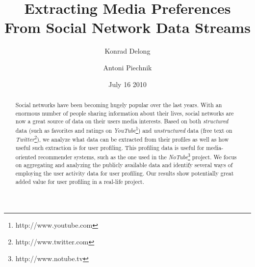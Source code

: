 \documentclass{article}
\begin{document}
\title{\textbf{Extracting Media Preferences From Social Network Data Streams}}
\author{Konrad Delong \and Antoni Piechnik}
\date{July 16 2010}

\maketitle

\begin{abstract} Social networks have been becoming hugely popular over the last
years. With an enormous number of people sharing information about their lives,
social networks are now a great source of data on their users media interests. Based on both
\textit{structured} data (such as favorites and ratings on \textit{YouTube}\footnote{http://www.youtube.com})
and \textit{unstructured} data (free text on \textit{Twitter}\footnote{http://www.twitter.com}),
we analyze what data can be extracted from their profiles as well as how useful such extraction
is for user profiling. This profiling data is useful for media-oriented recommender
systems, such as the one used in the \textit{NoTube}\footnote{http://www.notube.tv} project.
We focus on aggregating and analyzing the publicly available data and
identify several ways of employing the user activity data for user profiling.
Our results show potentially great added value for user profiling in a real-life project.
\end{abstract}



















\end{document}
